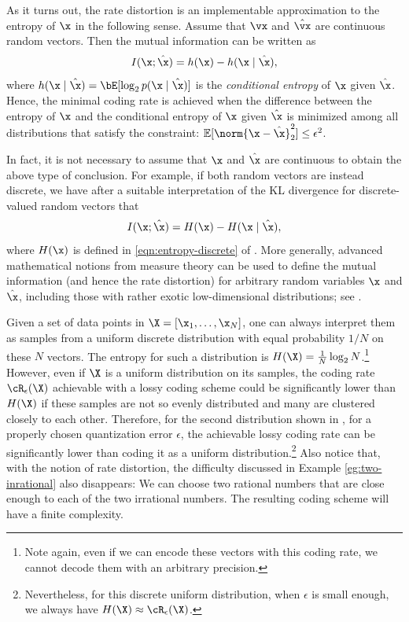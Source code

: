 \documentclass[../../book-main.tex]{subfiles}
\begin{document}
\begin{remark}
	As it turns out, the rate distortion is an implementable
	approximation to the entropy of $\x$ in the following sense.
	Assume that $\vx$ and $\hat{\vx}$ are continuous random vectors.
	Then the mutual information can be written as
	\begin{equation}\label{eq:information-entropy}
		I(\x; \hat\x) = h(\x) - h(\x \mid \hat \x),
	\end{equation}
	where $h(\x \mid \hat \x) = \bE[\log_2 p(\x \mid \hat\x)]$ is the
	\textit{conditional entropy} of $\x$ given $\hat \x$.
	Hence, the minimal coding rate is achieved when the difference between the
	entropy of $\x$ and the conditional entropy of $\x$ given $\hat \x$
	is minimized among all distributions that satisfy
	the constraint: $\mathbb{E} [\norm{\x- \hat \x}_2^2] \le \epsilon^2$. 

	In fact, it is not necessary to assume that $\x$ and $\hat \x$ are continuous
	to obtain the above type of conclusion. For example, if both random vectors
	are instead discrete, we have after a suitable interpretation of the KL
	divergence for discrete-valued random vectors that
	\begin{equation}
		I(\x; \hat\x) = H(\x) - H(\x \mid \hat \x),
	\end{equation}
    where $H(\x)$ is defined in \eqref{eqn:entropy-discrete} of . 
	More generally, advanced mathematical notions from measure theory can be
	used to define the mutual information (and hence the rate distortion) for
	arbitrary random variables $\x$ and $\hat \x$, including those with rather
	exotic low-dimensional distributions; see \textcite[\S 8.5]{Cover-Thomas}.
\end{remark}

\begin{remark}
    Given a set of data points in $\X = [\x_1,\ldots, \x_N]$, one can always
	interpret them as samples from a uniform discrete distribution with equal
	probability $1/N$ on these $N$ vectors. The entropy for such a distribution
	is $H(\X) = \frac{1}{N}\log_2 N$.\footnote{Note again, even if we can encode
	these vectors with this coding rate, we cannot decode them with an arbitrary
	precision.} However, even if $\X$ is  a uniform distribution on its samples,
	the coding rate $\cR_{\epsilon}(\X)$ achievable with a lossy coding scheme
	could be significantly lower than $H(\X)$ if these samples are not so evenly
	distributed and many are clustered closely to each other. Therefore, for the
	second distribution shown in , for a properly chosen
	quantization error  $\epsilon$, the achievable lossy coding rate can be
	significantly lower than coding it as a uniform
	distribution.\footnote{Nevertheless, for this discrete uniform distribution,
	when $\epsilon$ is small enough, we always have $H(\X) \approx \cR_{\epsilon}(\X)$.} Also notice that, with the notion of rate distortion, the difficulty discussed in Example \ref{eg:two-inrational} also disappears: We can choose two rational numbers that are close enough to each of the two irrational numbers. The resulting coding scheme will have a finite complexity. 
\end{remark}
\end{document}
